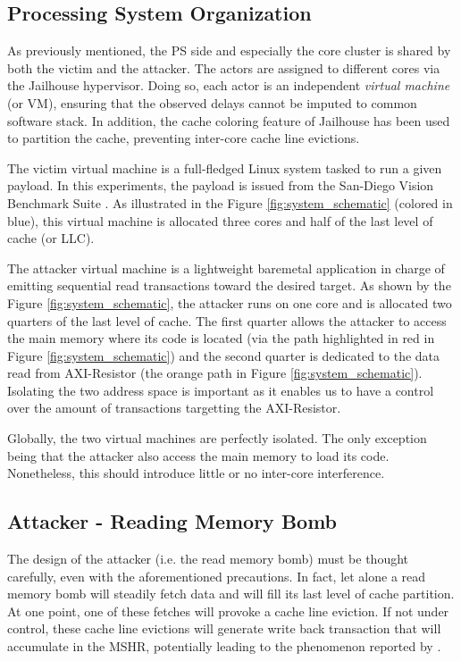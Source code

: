     \subsection{Processing System Organization}
        \label{subsec:processing_system_organization}
        As previously mentioned, the PS side and especially the core cluster is shared by both the victim and the attacker. The actors are assigned to different cores via the Jailhouse hypervisor\cite{jailhouse}. Doing so, each actor is an independent \emph{virtual machine} (or VM), ensuring that the observed delays cannot be imputed to common software stack. In addition, the cache coloring feature of Jailhouse has been used to partition the cache, preventing inter-core cache line evictions.

        The victim virtual machine is a full-fledged Linux system tasked to run a given payload. In this experiments, the payload is issued from the San-Diego Vision Benchmark Suite \cite{SD-VBS}. As illustrated in the Figure \ref{fig:system_schematic} (colored in blue), this virtual machine is allocated three cores and half of the last level of cache (or LLC).

        The attacker virtual machine is a lightweight baremetal application in charge of emitting sequential read transactions toward the desired target. As shown by the Figure \ref{fig:system_schematic}, the attacker runs on one core and is allocated two quarters of the last level of cache. The first quarter allows the attacker to access the main memory where its code is located (via the path highlighted in red in Figure \ref{fig:system_schematic}) and the second quarter is dedicated to the data read from AXI-Resistor (the orange path in Figure \ref{fig:system_schematic}). Isolating the two address space is important as it enables us to have a control over the amount of transactions targetting the AXI-Resistor.

        Globally, the two virtual machines are perfectly isolated. The only exception being that the attacker also access the main memory to load its code. Nonetheless, this should introduce little or no inter-core interference.

    \subsection{Attacker - Reading Memory Bomb}
        \label{subsec:attacker_reading_memory_bomb}
        The design of the attacker (i.e. the read memory bomb) must be thought carefully, even with the aforementioned precautions. In fact, let alone a read memory bomb will steadily fetch data and will fill its last level of cache partition. At one point, one of these fetches will provoke a cache line eviction. If not under control, these cache line evictions will generate write back transaction that will accumulate in the MSHR, potentially leading to the phenomenon reported by \cite{Heechul_DDOS_attacks_on_shared_cache}.


